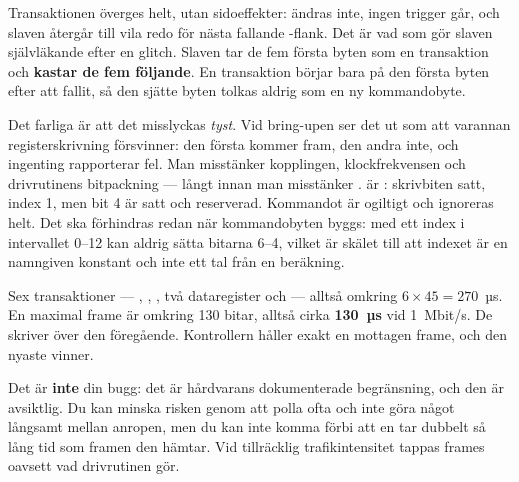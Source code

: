  Transaktionen överges helt, utan sidoeffekter:  ändras inte, ingen trigger
går, och slaven återgår till vila redo för nästa fallande -flank. Det är vad som gör
slaven självläkande efter en glitch.
 Slaven tar de fem första byten som en transaktion och \textbf{kastar de fem följande}. En
transaktion börjar bara på den första byten efter att  fallit, så den sjätte byten
tolkas aldrig som en ny kommandobyte.

Det farliga är att det misslyckas \emph{tyst}. Vid bring-upen ser det ut som att varannan
registerskrivning försvinner: den första kommer fram, den andra inte, och ingenting rapporterar
fel. Man misstänker kopplingen, klockfrekvensen och drivrutinens bitpackning --- långt innan man
misstänker .
  är : skrivbiten satt, index 1, men bit 4 är satt och
reserverad. Kommandot är ogiltigt och ignoreras helt. Det ska förhindras redan när kommandobyten
byggs:  med ett index i intervallet 0--12 kan aldrig sätta bitarna 6--4,
vilket är skälet till att indexet är en namngiven konstant och inte ett tal från en beräkning.

 Sex transaktioner --- , , , två dataregister och
 --- alltså omkring $6 \times 45 = 270$~µs.
 En maximal frame är omkring 130 bitar, alltså cirka \textbf{130~µs} vid 1~Mbit/s.
 De skriver över den föregående. Kontrollern håller exakt en mottagen frame, och den nyaste
vinner.

Det är \textbf{inte} din bugg: det är hårdvarans dokumenterade begränsning, och den är avsiktlig.
Du kan minska risken genom att polla ofta och inte göra något långsamt mellan anropen, men du kan
inte komma förbi att en  tar dubbelt så lång tid som framen den hämtar. Vid
tillräcklig trafikintensitet tappas frames oavsett vad drivrutinen gör.
